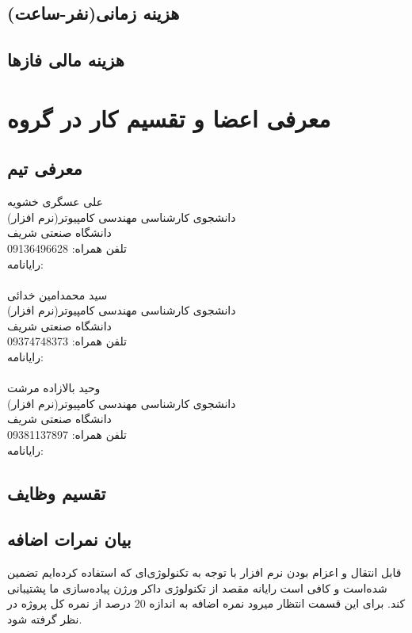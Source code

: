 \documentclass{article}
\begin{document}
\subsection{هزینه زمانی(نفر-ساعت)}
\subsection{هزینه مالی فازها}
\section{معرفی اعضا و تقسیم کار در گروه}
\subsection{معرفی تیم}
علی عسگری خشویه\\
دانشجوی کارشناسی مهندسی کامپیوتر(نرم افزار)\\
دانشگاه صنعتی شریف\\
تلفن همراه: 09136496628 \\
رایانامه: \\
\\
سید محمدامین خدائی\\
دانشجوی کارشناسی مهندسی کامپیوتر(نرم افزار)\\
دانشگاه صنعتی شریف\\
تلفن همراه: 09374748373\\
رایانامه: \\
\\
وحید بالازاده مرشت\\
دانشجوی کارشناسی مهندسی کامپیوتر(نرم افزار)\\
دانشگاه صنعتی شریف\\
تلفن همراه: 09381137897\\
رایانامه: 
\subsection{تقسیم وظایف}

\subsection{بیان نمرات اضافه}
قابل انتقال و اعزام بودن نرم افزار با توجه به تکنولوژی‌ای که استفاده کرده‌ایم تضمین شده‌است و کافی است رایانه مقصد از تکنولوژی داکر ورژن پیاده‌سازی ما پشتیبانی کند. برای این قسمت انتظار میرود نمره اضافه به اندازه 20 درصد از نمره کل پروژه در نظر گرفته شود.
\end{document}
